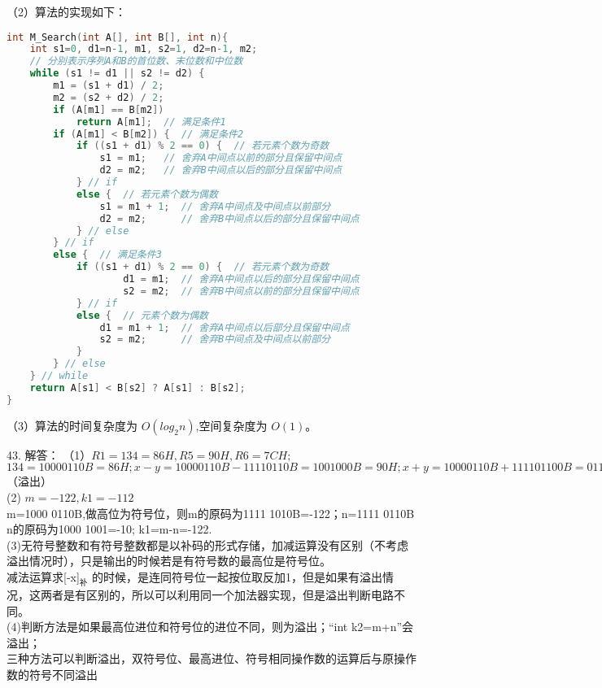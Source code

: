 （2）算法的实现如下：
\begin{lstlisting}[language=cpp]
int M_Search(int A[], int B[], int n){
    int s1=0, d1=n-1, m1, s2=1, d2=n-1, m2;
    // 分别表示序列A和B的首位数、末位数和中位数
    while (s1 != d1 || s2 != d2) {
        m1 = (s1 + d1) / 2;
        m2 = (s2 + d2) / 2;
        if (A[m1] == B[m2])
            return A[m1];  // 满足条件1
        if (A[m1] < B[m2]) {  // 满足条件2
            if ((s1 + d1) % 2 == 0) {  // 若元素个数为奇数
                s1 = m1;   // 舍弃A中间点以前的部分且保留中间点
                d2 = m2;   // 舍弃B中间点以后的部分且保留中间点
            } // if
            else {  // 若元素个数为偶数
                s1 = m1 + 1;  // 舍弃A中间点及中间点以前部分
                d2 = m2;      // 舍弃B中间点以后的部分且保留中间点
            } // else
        } // if
        else {  // 满足条件3
            if ((s1 + d1) % 2 == 0) {  // 若元素个数为奇数
                    d1 = m1;  // 舍弃A中间点以后的部分且保留中间点
                    s2 = m2;  // 舍弃B中间点以前的部分且保留中间点
            } // if
            else {  // 元素个数为偶数
                d1 = m1 + 1;  // 舍弃A中间点以后部分且保留中间点
                s2 = m2;      // 舍弃B中间点及中间点以前部分
            }
        } // else
    } // while
    return A[s1] < B[s2] ? A[s1] : B[s2];
}
\end{lstlisting}

（3）算法的时间复杂度为 $O(log_2n)$,空间复杂度为 $O(1)$。


43. 解答：
（1）$R1=134=86H, R5=90H, R6=7CH;$ \\
$134=1000 0110B=86H; x-y=1000 0110B-1111 0110B=1001 000B=90H; x+y=1000 0110B+1111 01100B=0111 1100B$（溢出） \\
(2) $m=-122, k1=-112$ \\
m=1000 0110B,做高位为符号位，则m的原码为1111 1010B=-122；n=1111 0110B \\
n的原码为1000 1001=-10; k1=m-n=-122. \\
(3)无符号整数和有符号整数都是以补码的形式存储，加减运算没有区别（不考虑溢出情况时），只是输出的时候若是有符号数的最高位是符号位。 \\
减法运算求[-x]$_\text{补}$ 的时候，是连同符号位一起按位取反加1，但是如果有溢出情况，这两者是有区别的，所以可以利用同一个加法器实现，但是溢出判断电路不同。 \\
(4)判断方法是如果最高位进位和符号位的进位不同，则为溢出；“int k2=m+n”会溢出； \\
三种方法可以判断溢出，双符号位、最高进位、符号相同操作数的运算后与原操作数的符号不同溢出


